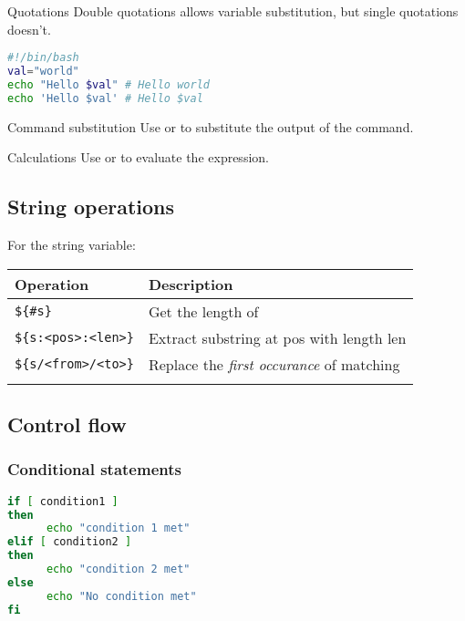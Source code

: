 \documentclass{article}
\begin{document}
\begin{knBox}
      {Quotations}
      Double quotations allows variable substitution, but single quotations doesn't.
      \begin{lstlisting}[language=bash]
#!/bin/bash
val="world"
echo "Hello $val" # Hello world
echo 'Hello $val' # Hello $val     \end{lstlisting}
\end{knBox}

\begin{knBox}
      {Command substitution}
      Use  or  to substitute the output of the command.
\end{knBox}

\begin{knBox}
      {Calculations}
      Use  or  to evaluate the expression.
\end{knBox}

\subsection{String operations}
For the  string variable:
\begin{table}[H]
      \begin{tabular}{ll}
            \textbf{Operation}           & \textbf{Description}                                        \\ \hline
            \lstinline|${#s}|            & Get the length of  \\ \hline
            \lstinline|${s:<pos>:<len>}| & Extract substring at pos with length len                    \\ \hline
            \lstinline|${s/<from>/<to>}| & Replace the \emph{first occurance} of matching              \\ \hline
      \end{tabular}
\end{table}

\subsection{Control flow}

\subsubsection{Conditional statements}
\begin{lstlisting}[language=bash]
if [ condition1 ]
then
      echo "condition 1 met"
elif [ condition2 ]
then
      echo "condition 2 met"
else
      echo "No condition met"
fi \end{lstlisting}
\end{document}

